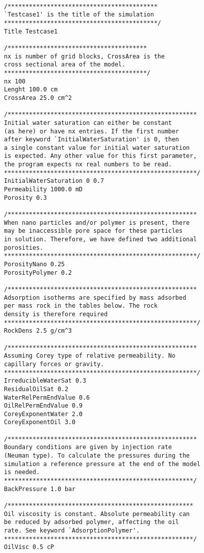 \begin{appendices}
\begin{lstlisting}

/******************************************
`Testcase1' is the title of the simulation 
*******************************************/
Title Testcase1

/***************************************
nx is number of grid blocks, CrossArea is the 
cross sectional area of the model.
****************************************/
nx 100
Lenght 100.0 cm
CrossArea 25.0 cm^2

/*****************************************************
Initial water saturation can either be constant 
(as here) or have nx entries. If the first number
after keyword `InitialWaterSaturation' is 0, then
a single constant value for initial water saturation
is expected. Any other value for this first parameter, 
the program expects nx real numbers to be read. 
******************************************************/  
InitialWaterSaturation 0 0.7
Permeability 1000.0 mD
Porosity 0.3

/*****************************************************
When nano particles and/or polymer is present, there 
may be inaccessible pore space for these particles
in solution. Therefore, we have defined two additional 
porosities.
******************************************************/
PorosityNano 0.25
PorosityPolymer 0.2

/*****************************************************
Adsorption isotherms are specified by mass adsorbed 
per mass rock in the tables below. The rock 
density is therefore required 
******************************************************/
RockDens 2.5 g/cm^3

/*****************************************************
Assuming Corey type of relative permeability. No 
capillary forces or gravity.
******************************************************/
IrreducibleWaterSat 0.3
ResidualOilSat 0.2
WaterRelPermEndValue 0.6
OilRelPermEndValue 0.9
CoreyExponentWater 2.0
CoreyExponentOil 3.0

/*****************************************************
Boundary conditions are given by injection rate 
(Neuman type). To calculate the pressures during the
simulation a reference pressure at the end of the model 
is needed.
*****************************************************/
BackPressure 1.0 bar

/****************************************************
Oil viscosity is constant. Absolute permeability can 
be reduced by adsorbed polymer, affecting the oil 
rate. See keyword `AdsorptionPolymer'.
*****************************************************/
OilVisc 0.5 cP


\end{lstlisting}
\end{appendices}

